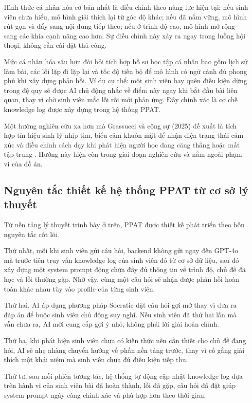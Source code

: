 \documentclass[../main.tex]{subfiles}
\begin{document}
Hình thức cá nhân hóa cơ bản nhất là điều chỉnh theo năng lực hiện tại: nếu sinh viên chưa hiểu, mô hình giải thích lại từ góc độ khác; nếu đã nắm vững, mô hình rút gọn và đẩy sang nội dung tiếp theo; nếu ở trình độ cao, mô hình mở rộng sang các khía cạnh nâng cao hơn. Sự điều chỉnh này xảy ra ngay trong luồng hội thoại, không cần cài đặt thủ công.

Mức cá nhân hóa sâu hơn đòi hỏi tích hợp hồ sơ học tập cá nhân bao gồm lịch sử làm bài, các lỗi lặp đi lặp lại và tốc độ tiến bộ để mô hình có ngữ cảnh đủ phong phú khi xây dựng phản hồi. Ví dụ cụ thể: một sinh viên hay quên điều kiện dừng trong đệ quy sẽ được AI chủ động nhắc về điểm này ngay khi bắt đầu bài liên quan, thay vì chờ sinh viên mắc lỗi rồi mới phản ứng. Đây chính xác là cơ chế knowledge log được xây dựng trong hệ thống PPAT.

Một hướng nghiên cứu xa hơn mà Grassucci và cộng sự (2025) đề xuất là tích hợp tín hiệu sinh lý nhịp tim, biểu cảm khuôn mặt để nhận diện trạng thái cảm xúc và điều chỉnh cách dạy khi phát hiện người học đang căng thẳng hoặc mất tập trung \cite{grassucci2026beyond}. Hướng này hiện còn trong giai đoạn nghiên cứu và nằm ngoài phạm vi của đồ án.

\subsection{Nguyên tắc thiết kế hệ thống PPAT từ cơ sở lý thuyết}

Từ nền tảng lý thuyết trình bày ở trên, PPAT được thiết kế phát triển theo bốn nguyên tắc cốt lõi.

Thứ nhất, mỗi khi sinh viên gửi câu hỏi, backend không gửi ngay đến GPT-4o mà trước tiên truy vấn knowledge log của sinh viên đó từ cơ sở dữ liệu, sau đó xây dựng một system prompt động chứa đầy đủ thông tin về trình độ, chủ đề đã học và lỗi thường gặp. Nhờ vậy, cùng một câu hỏi sẽ nhận được phản hồi hoàn toàn khác nhau tùy vào profile của từng sinh viên.

Thứ hai, AI áp dụng phương pháp Socratic đặt câu hỏi gợi mở thay vì đưa ra đáp án để buộc sinh viên chủ động suy nghĩ. Nếu sinh viên đã thử hai lần mà vẫn chưa ra, AI mới cung cấp gợi ý nhỏ, không phải lời giải hoàn chỉnh.

Thứ ba, khi phát hiện sinh viên chưa có kiến thức nền cần thiết cho chủ đề đang hỏi, AI sẽ nhẹ nhàng chuyển hướng về phần nền tảng trước, thay vì cố gắng giải thích một khái niệm mà sinh viên chưa đủ điều kiện tiếp thu.

Thứ tư, sau mỗi phiên tương tác, hệ thống tự động cập nhật knowledge log dựa trên hành vi của sinh viên bài đã hoàn thành, lỗi đã gặp, câu hỏi đã đặt giúp system prompt ngày càng chính xác và phù hợp hơn theo thời gian.
\end{document}
